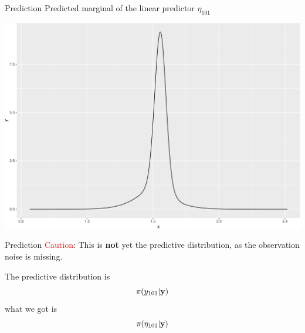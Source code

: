 \documentclass[
  handout]{beamer}
\newenvironment{Shaded}{\begin{snugshade}}{\end{snugshade}}
\newcommand{\AttributeTok}[1]{\textcolor[rgb]{0.77,0.63,0.00}{#1}}
\newcommand{\DecValTok}[1]{\textcolor[rgb]{0.00,0.00,0.81}{#1}}
\newcommand{\FunctionTok}[1]{\textcolor[rgb]{0.00,0.00,0.00}{#1}}
\newcommand{\NormalTok}[1]{#1}
\newcommand{\OtherTok}[1]{\textcolor[rgb]{0.56,0.35,0.01}{#1}}
\newcommand{\SpecialCharTok}[1]{\textcolor[rgb]{0.00,0.00,0.00}{#1}}
\begin{document}
\begin{frame}[fragile]{Prediction}
\protect\hypertarget{prediction-2}{}
Predicted marginal of the linear predictor \(\eta_{101}\)

\begin{Shaded}
\end{Shaded}

\begin{center}\includegraphics[width=0.6\linewidth]{Part2_RINLA_files/figure-beamer/unnamed-chunk-36-1} \end{center}
\end{frame}

\begin{frame}{Prediction}
\protect\hypertarget{prediction-3}{}
\textcolor{red}{Caution}: This is \textbf{not} yet the predictive
distribution, as the observation noise is missing.

The predictive distribution is \[
\pi(y_{101}|\bf{y})
\] what we got is \[
\pi(\eta_{101}|\bf{y})
\]
\end{frame}
\end{document}
